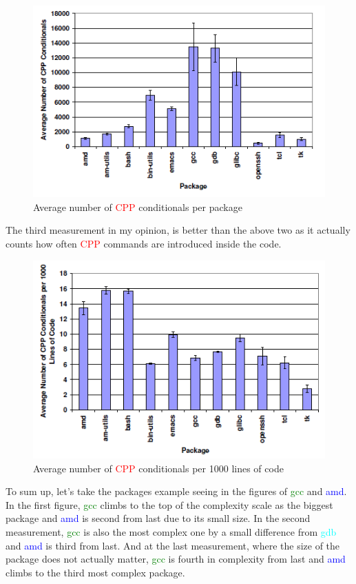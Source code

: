 \documentclass[11pt]{article}
\begin{document}
\begin{figure}[!htb]
\centering
  \includegraphics[width=.7\linewidth]{images/measure2}
  \caption{Average number of \textcolor{red}{CPP} conditionals per package \cite{zadok2002}}
  \label{fig:measure2}
\end{figure}
\FloatBarrier

The third measurement in my opinion, is better than the above two as it actually counts how often \textcolor{red}{CPP} commands are introduced inside the code.

\begin{figure}[!htb]
\centering
  \includegraphics[width=.7\linewidth]{images/measure3}
  \caption{Average number of \textcolor{red}{CPP} conditionals per 1000 lines
of code \cite{zadok2002}}
  \label{fig:measure3}
\end{figure}
\FloatBarrier
To sum up, let's take the packages example seeing in the figures of \textcolor{green}{gcc} and \textcolor{blue}{amd}. In the first figure, \textcolor{green}{gcc} climbs to the top of the complexity scale as the biggest package and \textcolor{blue}{amd} is second from last due to its small size. In the second measurement, \textcolor{green}{gcc} is also the most complex one by a small difference from \textcolor{cyan}{gdb} and \textcolor{blue}{amd} is third from last. And at the last measurement, where the size of the package does not actually matter, \textcolor{green}{gcc} is fourth in complexity from last and \textcolor{blue}{amd} climbs to the third most complex package.
\end{document}
